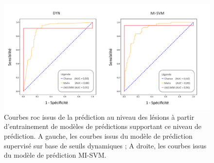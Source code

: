 \begin{figure}[H]
    \centering
    \includegraphics[width=\linewidth]{contents/chapter_6/resources/results_lesion_roc_lesions.pdf}
    \caption{Courbes \gls{roc} issus de la prédiction au niveau des lésions à partir d'entrainement de modèles de prédictions supportant ce niveau de prédiction. A gauche, les courbes issus du modèle de prédiction supervisé sur base de seuils dynamiques ; A droite, les courbes issus du modèle de prédiction MI-SVM.}
    \label{fig:results_lesion_roc_lesions}
\end{figure}\par

